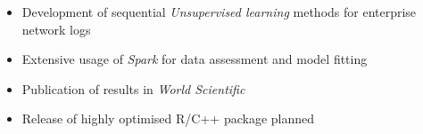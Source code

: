 \documentclass[11pt,a4paper,roman]{moderncv}   %
\begin{document}
{{{\vspace{0.2cm}

\vspace{-0.15cm}
\begin{itemize}%
\item Development of sequential \textit{Unsupervised learning} methods for enterprise network logs
\item Extensive usage of \textit{Spark} for data assessment and model fitting
\item Publication of results in \textit{World Scientific}
\item Release of highly optimised R/C++ package planned
\end{itemize}







}}}
\end{document}

